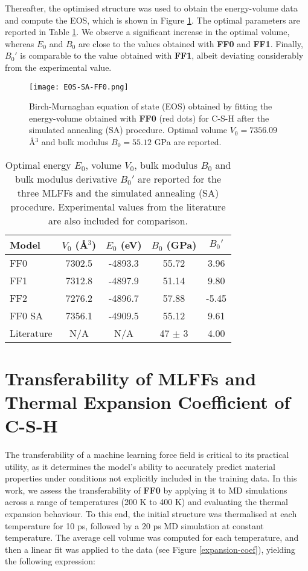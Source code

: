 Thereafter, the optimised structure was used to obtain the energy-volume data and compute the EOS, which is shown in Figure \ref{fig:eos-sa-ff0}. The optimal parameters are reported in Table \ref{tab:bulk-params}. We observe a significant increase in the optimal volume, whereas $E_0$ and $B_0$ are close to the values obtained with \textbf{FF0} and \textbf{FF1}. Finally, $B_0'$ is comparable to the value obtained with \textbf{FF1}, albeit deviating considerably from the experimental value.
\begin{figure}[H]
    \centering
    \texttt{[image: EOS-SA-FF0.png]}
    \caption{
    Birch-Murnaghan equation of state (EOS) obtained by fitting the energy-volume obtained with \textbf{FF0} (red dots) for C-S-H after the simulated annealing (SA) procedure. Optimal volume $V_0=7356.09$ \AA$^3$ and bulk modulus $B_0=55.12$ GPa are reported.
    }
    \label{fig:eos-sa-ff0}
\end{figure}

\begin{table}[h]
\centering
\caption{
    Optimal energy $E_0$, volume $V_0$, bulk modulus $B_0$ and bulk modulus derivative $B_0'$ are reported for the three MLFFs and the simulated annealing (SA) procedure. Experimental values from the literature are also included for comparison.}
\label{tab:bulk-params}
\begin{tabular}{lcccc}
\toprule
\midrule
\textbf{Model} & $V_0$ (\AA$^3$) & $E_0$ (eV) & $B_0$ (GPa) & $B_0'$ \\
\midrule
FF0       & 7302.5   & -4893.3  & 55.72      & 3.96   \\
FF1       & 7312.8   & -4897.9  & 51.14      & 9.80   \\
FF2       & 7276.2   & -4896.7  & 57.88      & -5.45  \\
FF0 SA    & 7356.1   & -4909.5  & 55.12      & 9.61   \\
Literature & N/A     & N/A      & 47 $\pm$ 3 & 4.00      \\
\midrule
\bottomrule
\end{tabular}
\end{table}



\section{Transferability of MLFFs and Thermal Expansion Coefficient of C-S-H}
\label{sec:transferability}
The transferability of a machine learning force field is critical to its practical utility, as it determines the model's ability to accurately predict material properties under conditions not explicitly included in the training data. In this work, we assess the transferability of \textbf{FF0} by applying it to MD simulations across a range of temperatures (200 K to 400 K) and evaluating the thermal expansion behaviour. To this end, the initial structure was thermalised at each temperature for 10 ps, followed by a 20 ps MD simulation at constant temperature. The average cell volume was computed for each temperature, and then a linear fit\supercite{Xu2007} was applied to the data (see Figure \ref{expansion-coef}), yielding the following expression:

